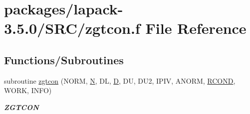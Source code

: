 \hypertarget{zgtcon_8f}{}\section{packages/lapack-\/3.5.0/\+S\+R\+C/zgtcon.f File Reference}
\label{zgtcon_8f}
\subsection*{Functions/\+Subroutines}
\begin{DoxyCompactItemize}
\item 
subroutine \hyperlink{group__complex16GTcomputational_ga245a808bba47aa88b0a67f9e518363bb}{zgtcon} (N\+O\+R\+M, \hyperlink{polmisc_8c_a0240ac851181b84ac374872dc5434ee4}{N}, D\+L, \hyperlink{odrpack_8h_a7dae6ea403d00f3687f24a874e67d139}{D}, D\+U, D\+U2, I\+P\+I\+V, A\+N\+O\+R\+M, \hyperlink{superlu__enum__consts_8h_af00a42ecad444bbda75cde1b64bd7e72a9b5c151728d8512307565994c89919d5}{R\+C\+O\+N\+D}, W\+O\+R\+K, I\+N\+F\+O)
\begin{DoxyCompactList}\small\item\em {\bfseries Z\+G\+T\+C\+O\+N} \end{DoxyCompactList}\end{DoxyCompactItemize}
